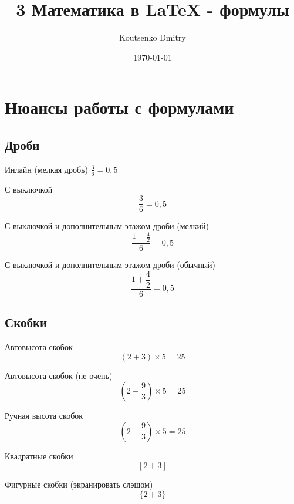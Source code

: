 \documentclass[a4paper,12pt]{article}                       %
\title{3 Математика в \LaTeX{} - формулы}
\author{Koutsenko Dmitry}
\date{\today}
\begin{document}

\maketitle

\section{Нюансы работы с формулами}

\subsection{Дроби}

Инлайн (мелкая дробь) $\frac{3}{6} = 0,5$

С выключкой \[\frac{3}{6} = 0,5\]

С выключкой и дополнительным этажом дроби (мелкий) \[\frac{1+\frac{4}{2}}{6} = 0,5\]

С выключкой и дополнительным этажом дроби (обычный) \[\frac{1+\dfrac{4}{2}}{6} = 0,5\]

\subsection{Скобки}

Автовысота скобок \[ (2+3) \times 5 = 25\]

Автовысота скобок (не очень) \[ (2+\frac{9}{3}) \times 5 = 25\]

Ручная высота скобок \[ \left(2+\frac{9}{3}\right) \times 5 = 25\]

Квадратные скобки \[ [2+3] \]

Фигурные скобки (экранировать слэшом) \[ \{2+3\} \]
\end{document}
